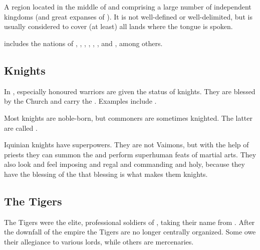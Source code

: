 \section{\Velcad}
\index{\Velcad}
A region located in the middle of  and comprising a large number of independent kingdoms (and great expanses of \Wylde{}). 
It is not well-defined or well-delimited, but is usually considered to cover (at least) all lands where the \Velcadian{} tongue is spoken. 


\Velcad{} includes the nations of , , , , , ,  and , among others. 









\subsection{Knights}
In , especially honoured warriors are given the status of knights. They are blessed by the  Church and carry the  \quo{\rah}. 
Examples include . 

Most knights are noble-born, but commoners are sometimes knighted. The latter are called . 

Iquinian knights have superpowers.
They are not Vaimons, but with the help of priests they can summon the \sephiroth and perform superhuman feats of martial arts.
They also look and feel imposing and regal and commanding and holy, because they have the blessing of the \sephiroth\dash{}that blessing is what makes them knights.









\subsection{The Tigers}
The Tigers were the elite, professional soldiers of , taking their name from . 
After the downfall of the empire the Tigers are no longer centrally organized. 
Some owe their allegiance to various lords, while others are mercenaries. 

